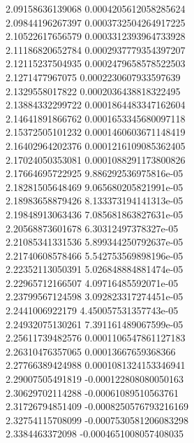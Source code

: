 {2.09158636139068 0.0004205612058285624 \\
2.09844196267397 0.0003732504264917225 \\
2.10522617656579 0.0003312393964733928 \\
2.11186820652784 0.0002937779354397207 \\
2.12115237504935 0.0002479658578522503 \\
2.1271477967075 0.0002230607933597639 \\
2.1329558017822 0.0002036438818322495 \\
2.13884332299722 0.0001864483347162604 \\
2.14641891866762 0.0001653345680097118 \\
2.15372505101232 0.0001460603671148419 \\
2.16402964202376 0.0001216109085362405 \\
2.17024050353081 0.0001088291173800826 \\
2.17664695722925 9.886292536975816e-05 \\
2.18281505648469 9.065680205821991e-05 \\
2.18983658879426 8.133373194141313e-05 \\
2.19848913063436 7.085681863827631e-05 \\
2.20568873601678 6.30312497378327e-05 \\
2.21085341331536 5.899344250792637e-05 \\
2.21740608578466 5.542753569898196e-05 \\
2.22352113050391 5.026848884881474e-05 \\
2.22965712166507 4.09716485592071e-05 \\
2.23799567124598 3.092823317274451e-05 \\
2.2441006922179 4.450057531357743e-05 \\
2.24932075130261 7.391161489067599e-05 \\
2.25611739482576 0.0001106547861127183 \\
2.26310476357065 0.00013667659368366 \\
2.27766389424988 0.0001081324153346941 \\
2.29007505491819 -0.000122808080050163 \\
2.30629702114288 -0.00061089510563761 \\
2.31726794851409 -0.0008250576793216169 \\
2.32754115708099 -0.0007530581206083298 \\
2.3384463372098 -0.0004651008057408035 \\
}
